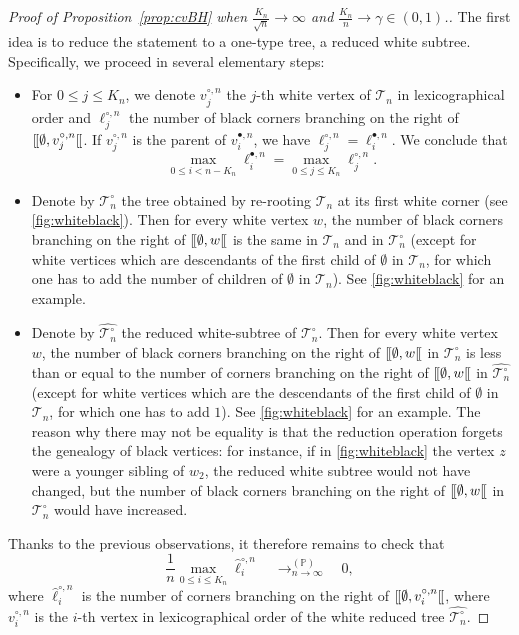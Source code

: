 \documentclass[10pt]{amsart}
\theoremstyle{definition}\newtheorem{defi}[theo]{Definition}\newtheorem{rema}[theo]{Remark}\newtheorem{exam}[theo]{Example}\newtheorem{exem}[theo]{Example}\newtheorem{nota}[theo]{Notation}
\renewcommand{\P}{\mathbb{P}}
\def\Ts{\mathscr{T}}
\def\llbracket{[\hspace{-.10em} [ }
\begin{document}
\begin{proof}[Proof of  Proposition~\ref{prop:cvBH}  when $\tfrac{K_{n}}{\sqrt{n}} \rightarrow \infty$ and $ \tfrac{K_{n}}{n}  \rightarrow \gamma \in (0,1)$.]
The first idea is to reduce the statement to a one-type tree, a reduced white subtree.  Specifically, we proceed in several elementary steps:
\begin{itemize}
  \item For $0 \le j\le K_n$, we denote $v^{\circ,n}_{j} $ the $j$-th white vertex of $\Ts_{n}$ in lexicographical order
    and $\ell^{\circ,n}_{j}$ the number of black corners  branching on the right of  $\llbracket \emptyset, v^{\circ,n}_{j} \llbracket$.
    If $v^{\circ,n}_{j}$ is the parent of $v^{\bullet,n}_{i}$, we have $\ell^{\circ,n}_{j}=\ell^{\bullet,n}_{i}$.
    We conclude that
    \[ \max_{0 \leq i < n-K_{n}} \ell^{\bullet,n}_{i}= \max_{0 \leq j \leq  K_{n}} \ell^{\circ,n}_{j}.\]
\item  Denote by $\Ts_{n}^{\circ}$ the tree obtained by re-rooting $\Ts_{n}$ at its first white corner (see \cref{fig:whiteblack}). Then for every white vertex $w$, the number of black corners branching on the right of $\llbracket \emptyset, w \llbracket$ is the same in $ \Ts_{n}$ and in  $\Ts_{n}^{\circ}$ (except for white vertices which are descendants of the first child of $\emptyset$ in $\Ts_{n}$, for which one has to add the number of children of $\emptyset$ in $\Ts_{n}$). See \cref{fig:whiteblack} for an example.
\item Denote by $\hat{\Ts_{n}^{\circ}}$ the reduced white-subtree of $\Ts_{n}^{\circ}$. Then for every white vertex $w$, the number of black corners branching on the right of $\llbracket \emptyset, w \llbracket$ in $\Ts_{n}^{\circ}$ is less than or equal to   the number  of  corners branching on the right of $\llbracket \emptyset, w \llbracket$  in  $\hat{\Ts_{n}^{\circ}}$ (except for white vertices which are the descendants of the first child of $\emptyset$ in $\Ts_{n}$, for which one has to add $1$).  See \cref{fig:whiteblack} for an example. The reason why there may not be equality is that the reduction operation forgets the genealogy of black vertices: for instance, if in \cref{fig:whiteblack} the vertex $z$ were a younger sibling of $w_{2}$, the reduced white subtree would not have changed, but  the number of black corners branching on the right of $\llbracket \emptyset, w \llbracket$ in $\Ts_{n}^{\circ}$ would have increased.
\end{itemize}

Thanks to the previous observations, it therefore remains to check that
\[ \frac{1}{n}  \max_{0 \leq i  \leq K_{n}} \hat{\ell}^{\circ,n}_{i}  \quad \mathop{\longrightarrow}^{(\P)}_{n \rightarrow \infty} \quad 0,\]
where $\hat{\ell}^{\circ,n}_{i}$ is the number of  corners  branching on the right of  $\llbracket \emptyset, v^{\circ,n}_{i} \llbracket$, where $v^{\circ,n}_{i} $ is the $i$-th  vertex in lexicographical order of the white reduced tree $\hat{\Ts^{\circ}_{n}}$.


\end{proof}
\end{document}
